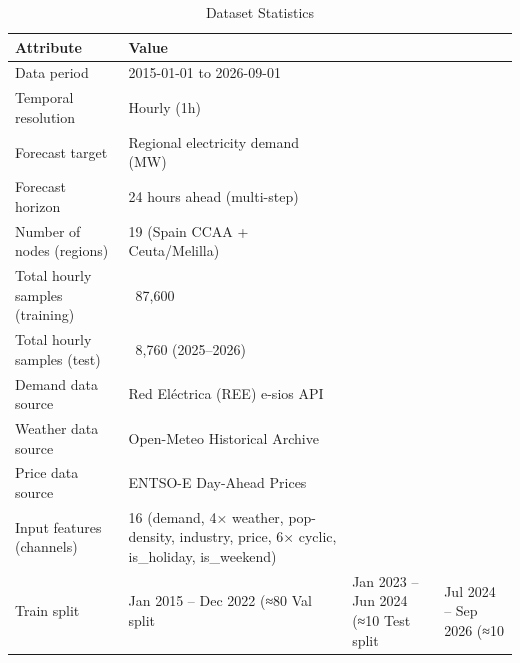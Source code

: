 \begin{table}[h]
\centering
\caption{Dataset Statistics}
\label{tab:dataset}
\begin{tabular}{@{}ll@{}}\toprule
Attribute & Value \\ \midrule
Data period & 2015-01-01 to 2026-09-01 \\
Temporal resolution & Hourly (1h) \\
Forecast target & Regional electricity demand (MW) \\
Forecast horizon & 24 hours ahead (multi-step) \\
Number of nodes (regions) & 19 (Spain CCAA + Ceuta/Melilla) \\
Total hourly samples (training) & ~87,600 \\
Total hourly samples (test) & ~8,760 (2025–2026) \\
Demand data source & Red Eléctrica (REE) e-sios API \\
Weather data source & Open-Meteo Historical Archive \\
Price data source & ENTSO-E Day-Ahead Prices \\
Input features (channels) & 16 (demand, 4× weather, pop-density, industry, price, 6× cyclic, is_holiday, is_weekend) \\
Train split & Jan 2015 – Dec 2022 (≈80%
Val split & Jan 2023 – Jun 2024 (≈10%
Test split & Jul 2024 – Sep 2026 (≈10%
\bottomrule
\end{tabular}
\end{table}
